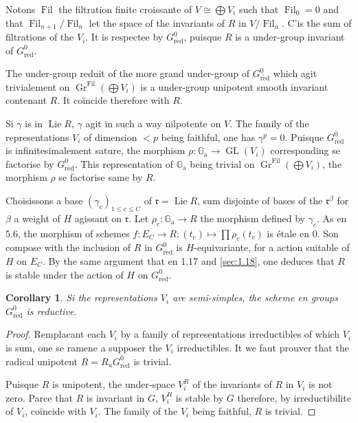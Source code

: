 \documentclass[11pt,a4paper]{article}
\theoremstyle{plain}
\newtheorem{corollary}[theorem]{Corollary}
\theoremstyle{definition}
\DeclareMathOperator{\Lie}{Lie}
\DeclareMathOperator{\GL}{GL}
\DeclareMathOperator{\Fil}{Fil}
\DeclareMathOperator{\Gr}{Gr}
\newcommand{\Ga}{\mathbb{G}_\mathrm{a}}
\newcommand{\red}{\mathrm{r\acute{e}d}}
\begin{document}
Notons $\Fil$ the filtration finite croissante of $V \cong \bigoplus V_i$ such that $\Fil_0 = 0$ and that $\Fil_{n+1}/\Fil_n$ let the space of the invariants of $R$ in $V/\Fil_n$. C'is the sum of filtrations of the $V_i$. It is respectee by $G^0_\red$, puisque $R$ is a under-group invariant of $G^0_\red$.

The under-group reduit of the more grand under-group of $G^0_\red$ which agit trivialement on $\Gr^{\Fil}(\bigoplus V_i)$ is a under-group unipotent smooth invariant contenant $R$. It co\"incide therefore with $R$.

Si $\gamma$ is in $\Lie R$, $\gamma$ agit in such a way nilpotente on $V$. The family of the representations $V_i$ of dimension $< p$ being faithful, one has $\gamma^p = 0$. Puisque $G^0_\red$ is infinitesimalement sature, the morphism $\rho: \Ga \to \GL(V_i)$ corresponding se factorise by $G^0_\red$. This representation of $\Ga$ being trivial on $\Gr^{\Fil}(\bigoplus V_i)$, the morphism $\rho$ se factorise same by $R$.

Choisissons a base $(\gamma_c)_{1 \leq c \leq C}$ of $\mathfrak{r} = \Lie R$, sum disjointe of bases of the $\mathfrak{r}^\beta$ for $\beta$ a weight of $H$ agissant on $\mathfrak{r}$. Let $\rho_c: \Ga \to R$ the morphism defined by $\gamma_c$. As en 5.6, the morphism of schemes $f: E_C \to R: (t_c) \mapsto \prod \rho_c(t_c)$ is étale en $0$. Son compose with the inclusion of $R$ in $G^0_\red$ is $H$-equivariante, for a action suitable of $H$ on $E_C$. By the same argument that en 1.17 and \ref{sec:1.18}, one deduces that $R$ is stable under the action of $H$ on $G^0_\red$.

\begin{corollary}\label{cor:1.24}
Si the representations $V_i$ are semi-simples, the scheme en groups $G^0_\red$ is reductive.
\end{corollary}

\begin{proof}
Remplacant each $V_i$ by a family of representations irreductibles of which $V_i$ is sum, one se ramene a supposer the $V_i$ irreductibles. It we faut prouver that the radical unipotent $R = R_u G^0_\red$ is trivial.

Puisque $R$ is unipotent, the under-space $V_i^R$ of the invariants of $R$ in $V_i$ is not zero. Parce that $R$ is invariant in $G$, $V_i^R$ is stable by $G$ therefore, by irreductibilite of $V_i$, co\"incide with $V_i$. The family of the $V_i$ being faithful, $R$ is trivial.
\end{proof}
\end{document}
